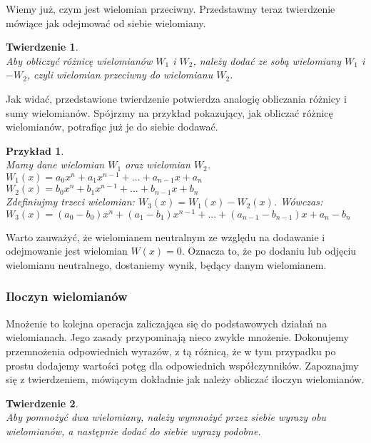 \documentclass[oneside,a4paper]{book}
\newtheorem{theorem}{Twierdzenie}
\newtheorem{example}{Przykład}
\begin{document}
	Wiemy już, czym jest wielomian przeciwny. Przedstawmy teraz twierdzenie mówiące jak odejmować od siebie wielomiany.
	
	\begin{theorem}
		$ $\\
		Aby obliczyć różnicę wielomianów $W_1$ i $W_2$, należy dodać ze sobą wielomiany $W_1$ i $-W_2$, czyli wielomian przeciwny do wielomianu $W_2$.
	\end{theorem}
	
	Jak widać, przedstawione twierdzenie potwierdza analogię obliczania różnicy i sumy wielomianów. Spójrzmy na przykład pokazujący, jak obliczać różnicę wielomianów, potrafiąc już je do siebie dodawać.
	
	\begin{example}
		$ $\\
		Mamy dane wielomian $W_1$ oraz wielomian $W_2$.
		$W_1(x) = a_0x^n + a_1x^{n-1} + ... + a_{n-1}x + a_n$ \\
		$W_2(x) = b_0x^n + b_1x^{n-1} + ... + b_{n-1}x + b_n$ \\
		Zdefiniujmy trzeci wielomian: $W_3(x) = W_1(x) - W_2(x)$. Wówczas: \\
		$W_3(x) = (a_0-b_0)x^n + (a_1-b_1)x^{n-1} + ... + (a_{n-1} - b_{n-1})x + a_n - b_n$
	\end{example}
	
	Warto zauważyć, że wielomianem neutralnym ze względu na dodawanie i odejmowanie jest wielomian $W(x)=0$. Oznacza to, że po dodaniu lub odjęciu wielomianu neutralnego, dostaniemy wynik, będący danym wielomianem.
	
	\subsubsection{Iloczyn wielomianów}
	
	Mnożenie to kolejna operacja zaliczająca się do podstawowych działań na wielomianach. Jego zasady przypominają nieco zwykłe mnożenie. Dokonujemy przemnożenia odpowiednich wyrazów, z tą różnicą, że w tym przypadku po prostu dodajemy wartości potęg dla odpowiednich współczynników. Zapoznajmy się z twierdzeniem, mówiącym dokładnie jak należy obliczać iloczyn wielomianów.
	
	\begin{theorem}
		$ $\\
		Aby pomnożyć dwa wielomiany, należy wymnożyć przez siebie wyrazy obu wielomianów, a następnie dodać do siebie wyrazy podobne.
	\end{theorem}
	
\end{document}
